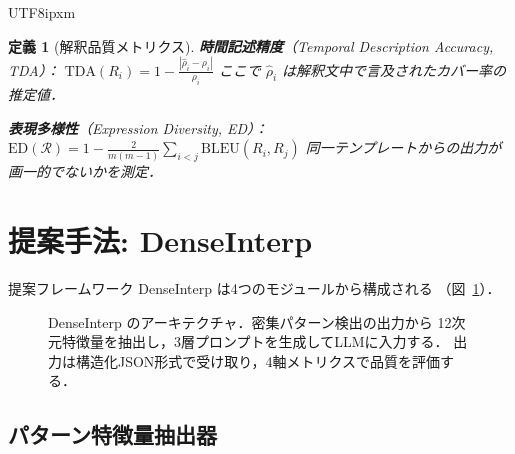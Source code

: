 \documentclass[conference]{IEEEtran}
\newtheorem{definition}{定義}
\begin{document}
\begin{CJK}{UTF8}{ipxm}
\begin{definition}[解釈品質メトリクス]
\noindent\textbf{時間記述精度}（Temporal Description Accuracy, TDA）：
$\text{TDA}(R_i) = 1 - \frac{|\hat{\rho}_i - \rho_i|}{\rho_i}$
ここで $\hat{\rho}_i$ は解釈文中で言及されたカバー率の推定値．

\noindent\textbf{表現多様性}（Expression Diversity, ED）：
$\text{ED}(\mathcal{R}) = 1 - \frac{2}{m(m-1)}\sum_{i<j}\text{BLEU}(R_i, R_j)$
同一テンプレートからの出力が画一的でないかを測定．
\end{definition}

\section{提案手法: DenseInterp}
\label{sec:method}

提案フレームワーク DenseInterp は4つのモジュールから構成される
（図~\ref{fig:architecture}）．

\begin{figure}[t]
    \centering
    \caption{DenseInterp のアーキテクチャ．密集パターン検出の出力から
    12次元特徴量を抽出し，3層プロンプトを生成してLLMに入力する．
    出力は構造化JSON形式で受け取り，4軸メトリクスで品質を評価する．}
    \label{fig:architecture}
\end{figure}

\subsection{パターン特徴量抽出器}


\end{CJK}
\end{document}
